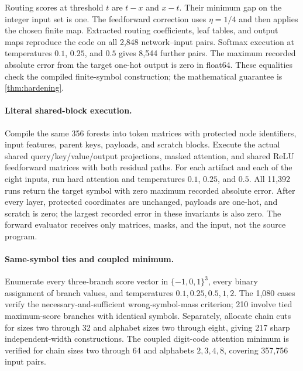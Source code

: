 Routing scores at threshold $t$ are $t-x$ and $x-t$. Their minimum gap on the integer input set is one. The feedforward correction uses $\eta=1/4$ and then applies the chosen finite map. Extracted routing coefficients, leaf tables, and output maps reproduce the code on all 2,848 network--input pairs. Softmax execution at temperatures $0.1$, $0.25$, and $0.5$ gives 8,544 further pairs. The maximum recorded absolute error from the target one-hot output is zero in float64. These equalities check the compiled finite-symbol construction; the mathematical guarantee is \cref{thm:hardening}.

\paragraph{Literal shared-block execution.}
Compile the same 356 forests into token matrices with protected node identifiers, input features, parent keys, payloads, and scratch blocks. Execute the actual shared query/key/value/output projections, masked attention, and shared ReLU feedforward matrices with both residual paths. For each artifact and each of the eight inputs, run hard attention and temperatures $0.1$, $0.25$, and $0.5$. All 11,392 runs return the target symbol with zero maximum recorded absolute error. After every layer, protected coordinates are unchanged, payloads are one-hot, and scratch is zero; the largest recorded error in these invariants is also zero. The forward evaluator receives only matrices, masks, and the input, not the source program.

\paragraph{Same-symbol ties and coupled minimum.}
Enumerate every three-branch score vector in $\{-1,0,1\}^3$, every binary assignment of branch values, and temperatures $0.1,0.25,0.5,1,2$. The 1,080 cases verify the necessary-and-sufficient wrong-symbol-mass criterion; 210 involve tied maximum-score branches with identical symbols. Separately, allocate chain cuts for sizes two through 32 and alphabet sizes two through eight, giving 217 sharp independent-width constructions. The coupled digit-code attention minimum is verified for chain sizes two through 64 and alphabets $2,3,4,8$, covering 357,756 input pairs.
